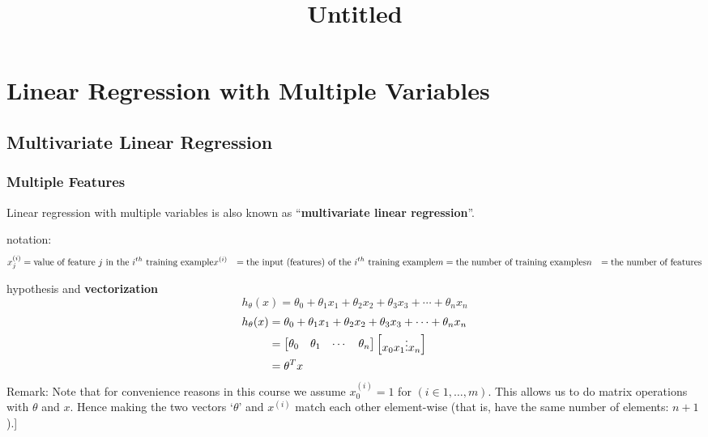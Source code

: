\documentclass[11pt]{article}
\title{Untitled}
\begin{document}
    
    
    \maketitle
    
    

    
    \hypertarget{linear-regression-with-multiple-variables}{%
\section{Linear Regression with Multiple
Variables}\label{linear-regression-with-multiple-variables}}

\hypertarget{multivariate-linear-regression}{%
\subsection{Multivariate Linear
Regression}\label{multivariate-linear-regression}}

\hypertarget{multiple-features}{%
\subsubsection{Multiple Features}\label{multiple-features}}

Linear regression with multiple variables is also known as
``\textbf{multivariate linear regression}''.

notation: \[
\begin{aligned}x_j^{(i)} &= \text{value of feature } j \text{ in the }i^{th}\text{ training example} \newline x^{(i)}& = \text{the input (features) of the }i^{th}\text{ training example} \newline m &= \text{the number of training examples} \newline n &= \text{the number of features} \end{aligned}
\]

hypothesis and \textbf{vectorization} \[
h_\theta (x) = \theta_0 + \theta_1 x_1 + \theta_2 x_2 + \theta_3 x_3 + \cdots + \theta_n x_n
\] \[
\begin{aligned}
h_\theta(x) & =\theta_0 + \theta_1 x_1 + \theta_2 x_2 + \theta_3 x_3 + \cdots + \theta_n x_n \\
& = \begin{bmatrix}\theta_0 &\theta_1 & \cdots & \theta_n\end{bmatrix}\begin{bmatrix}x_0 \newline x_1 \newline \vdots \newline x_n\end{bmatrix} \\
&= \theta^T x
\end{aligned}
\] Remark: Note that for convenience reasons in this course we assume
\(x^{(i)}_0=1\) for \((i∈1,…,m)\). This allows us to do matrix
operations with \(\theta\) and \(x\). Hence making the two vectors
`\(θ\)' and \(x^{(i)}\) match each other element-wise (that is, have the
same number of elements: \(n+1\)).{]}
\end{document}
